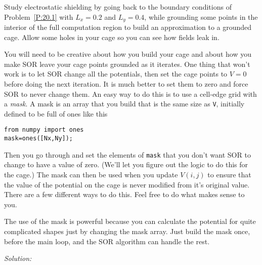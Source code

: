 \begin{enumerate}
\begin{enumerate}
\prob \label{P:20.3}
 

Study electrostatic shielding by going back to the boundary
conditions of Problem~\ref{P:20.1} with $L_x = 0.2$ and
$L_y=0.4$, while grounding some points in the interior of
the full computation region to build an approximation to a
grounded cage. Allow some holes in your cage so you can see
how fields leak in.

You will need to be creative about how you build your cage
and about how you make SOR leave your cage points grounded
as it iterates. One thing that won't work is to let SOR
change all the potentials, then set the cage points to
$V=0$ before doing the next iteration. It is much better to
set them to zero and force SOR to never change them. An
easy way to do this is to use a cell-edge grid with a
\emph{mask}.  A mask is an array that you build that is the
same size as {\tt V}, initially defined to be full of ones
like this
\begin{Verbatim}
from numpy import ones
mask=ones([Nx,Ny]);
\end{Verbatim}
Then you go through and set the elements of {\tt mask} that you don't
want SOR to change to have a value of zero.  (We'll let you figure out
the logic to do this for the cage.)  The mask can then be used when
you update $V(i,j)$ to ensure that the value of the potential on the
cage is never modified from it's original value. There are a few
different ways to do this.  Feel free to do what makes sense to you.


The use of the mask is powerful because you
can calculate the potential for quite complicated shapes just by
changing the mask array.  Just build the mask once, before the main
loop, and the SOR algorithm can handle the rest.

\end{enumerate}
\end{enumerate}
\ifsolutions
\textit{Solution:}\\
